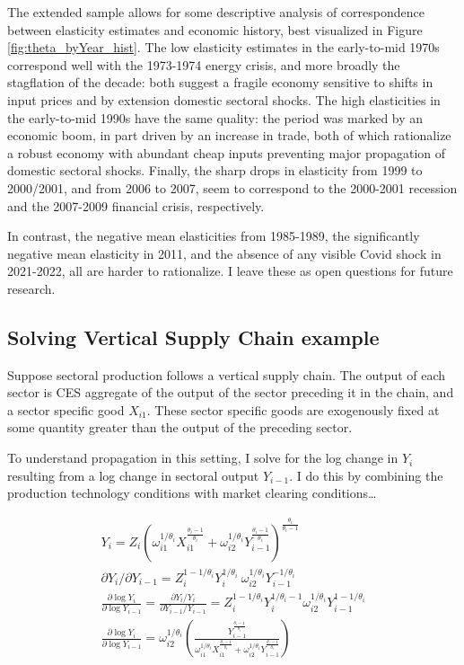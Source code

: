 \documentclass[11pt]{article}
\begin{document}
The extended sample allows for some descriptive analysis of correspondence between elasticity estimates and economic history, best visualized in Figure \ref{fig:theta_byYear_hist}. The low elasticity estimates in the early-to-mid 1970s correspond well with the 1973-1974 energy crisis, and more broadly the stagflation of the decade: both suggest a fragile economy sensitive to shifts in input prices and by extension domestic sectoral shocks. The high elasticities in the early-to-mid 1990s have the same quality: the period was marked by an economic boom, in part driven by an increase in trade, both of which rationalize a robust economy with abundant cheap inputs preventing major propagation of domestic sectoral shocks. Finally, the sharp drops in elasticity from 1999 to 2000/2001, and from 2006 to 2007, seem to correspond to the 2000-2001 recession and the 2007-2009 financial crisis, respectively.

In contrast, the negative mean elasticities from 1985-1989, the significantly negative mean elasticity in 2011, and the absence of any visible Covid shock in 2021-2022, all are harder to rationalize. I leave these as open questions for future research.

\subsection{Solving Vertical Supply Chain example}
\label{ap:stylized_example}

Suppose sectoral production follows a vertical supply chain. The output of each sector is CES aggregate of the output of the sector preceding it in the chain, and a sector specific good $X_{i1}$. These sector specific goods are exogenously fixed at some quantity greater than the output of the preceding sector. 

To understand propagation in this setting, I solve for the log change in $Y_i$ resulting from a log change in sectoral output $Y_{i-1}$. I do this by combining the production technology conditions with market clearing conditions\dots

\[
\begin{aligned}
Y_i = Z_i \left(\omega_{i1}^{1/\theta_i} X_{i1}^{\frac{\theta_i - 1}{\theta_i}} + \omega_{i2}^{1/\theta_i} Y_{i-1}^{\frac{\theta_i - 1}{\theta_i}}\right)^{\frac{\theta_i}{\theta_i - 1}} \\
\partial Y_i/\partial Y_{i-1} = Z_i^{1-1/\theta_i} Y_i^{1/\theta_i}\ \omega_{i2}^{1/\theta_i} Y_{i-1}^{-1/\theta_i} \\
\frac{\partial \log Y_i}{\partial \log Y_{i-1}} = \frac{\partial Y_i/Y_i}{\partial Y_{i-1}/Y_{i-1}} = Z_i^{1-1/\theta_i} Y_i^{1/\theta_i-1} \omega_{i2}^{1/\theta_i} Y_{i-1}^{1-1/\theta_i} \\
\frac{\partial \log Y_i}{\partial \log Y_{i-1}} = \omega_{i2}^{1/\theta_i} \left( \frac{Y_{i-1}^{\frac{\theta_i-1}{\theta_i}}}{\omega_{i1}^{1/\theta_i} X_{i1}^{\frac{\theta_i - 1}{\theta_i}} + \omega_{i2}^{1/\theta_i} Y_{i-1}^{\frac{\theta_i - 1}{\theta_i}}} \right)
\end{aligned}
\]
\end{document}
